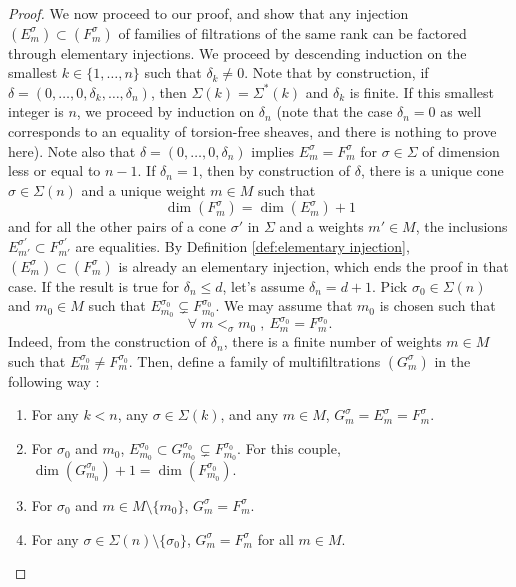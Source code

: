 \documentclass[a4paper,10pt]{amsart}
\theoremstyle{plain}{
    \newtheorem{theorem}{Theorem}[section]
    \newtheorem{lemma}[theorem]{Lemma}
    \newtheorem{corollary}[theorem]{Corollary}
    \newtheorem{proposition}[theorem]{Proposition}
    \newtheorem{conjecture}[theorem]{Conjecture}
}
\theoremstyle{definition}{
    \newtheorem{definition}[theorem]{Definition}
    \newtheorem{defn-thm}[theorem]{Definition-Theorem}
    \newtheorem{example}[theorem]{Example}
    \newtheorem{notation}[theorem]{Notation}
}
\theoremstyle{remark}{
    \newtheorem{remark}[theorem]{Remark}
    \newtheorem{problem}[theorem]{Problem}
    \newtheorem{question}[theorem]{Question}
}
\begin{document}
\begin{proof}
 We now proceed to our proof, and show that any injection $(E^\sigma_m)\subset (F^\sigma_m)$ of families of filtrations of the same rank can be factored through elementary injections. We proceed by descending induction on the smallest $k\in\lbrace 1,\ldots,n\rbrace$ such that $\delta_k\neq 0$. Note that by construction, if $\delta=(0,\ldots,0,\delta_k,\ldots,\delta_n)$, then $\Sigma(k)=\Sigma^*(k)$ and $\delta_k$ is finite. If this smallest integer is $n$, we proceed by induction on $\delta_n$ (note that the case $\delta_n=0$ as well corresponds to an equality of torsion-free sheaves, and there is nothing to prove here). Note also that $\delta=(0,\ldots,0,\delta_n)$ implies $E^\sigma_m=F^\sigma_m$ for $\sigma\in\Sigma$ of dimension less or equal to $n-1$. If $\delta_n=1$, then by construction of $\delta$, there is a unique cone $\sigma\in\Sigma(n)$ and a unique weight $m\in M$ such that 
 $$
 \dim(F^\sigma_m)=\dim(E^\sigma_m)+1
 $$
 and for all the other pairs of a cone $\sigma'$ in $\Sigma$ and a weights $m'\in M$, the inclusions $E^{\sigma'}_{m'}\subset F^{\sigma'}_{m'}$ are equalities. By Definition \ref{def:elementary injection}, $(E^\sigma_m)\subset (F^\sigma_m)$ is already an elementary injection, which ends the proof in that case. If the result is true for $\delta_n\leq d$, let's assume $\delta_n=d+1$. Pick $\sigma_0\in\Sigma(n)$ and $m_0\in M$ such that $E^{\sigma_0}_{m_0}\subsetneq F^{\sigma_0}_{m_0}$. We may assume that $m_0$ is chosen such that 
 \begin{equation}
  \label{eq:choice m0 for G}
  \forall\; m<_\sigma m_0\;,\: E^{\sigma_0}_{m}= F^{\sigma_0}_{m}.
 \end{equation}
Indeed, from the construction of $\delta_{n}$, there is a finite number of weights $m\in M$ such that $E^{\sigma_0}_{m}\neq F^{\sigma_0}_{m}$. Then, define a family of multifiltrations $(G^\sigma_m)$ in the following way :
 \begin{enumerate}
  \item[$(G1)$] For any $k<n$, any $\sigma\in\Sigma(k)$, and any $m\in M$, $G^\sigma_m=E^\sigma_m=F^\sigma_m$.
  \item[$(G2)$] For $\sigma_0$ and $m_0$, $E^{\sigma_0}_{m_0}\subset G^{\sigma_0}_{m_0}\subsetneq F^{\sigma_0}_{m_0}$. For this couple, $\dim(G^{\sigma_0}_{m_0})+1=\dim(F^{\sigma_0}_{m_0})$.
  \item[$(G3)$] For $\sigma_0$ and $m\in M\setminus\lbrace m_0\rbrace$, $G_m^\sigma=F_m^\sigma$.
  \item[$(G4)$] For any $\sigma\in\Sigma(n)\setminus\lbrace\sigma_0\rbrace$, $G^\sigma_m=F^\sigma_m$ for all $m\in M$. 
 \end{enumerate}
 

\end{proof}
\end{document}
